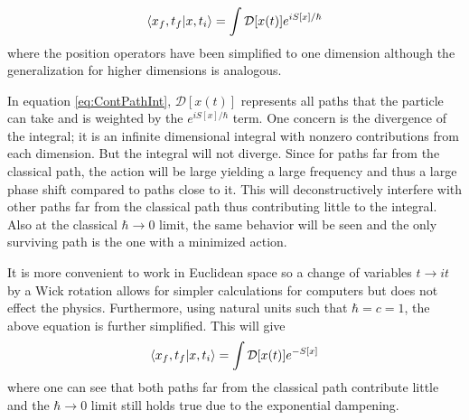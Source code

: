 \documentclass[11pt]{article}
\begin{document}
\begin{align}
	\bra{x_f,t_f}\ket{x,t_i}=\int\mathcal{D}[x(t)]e^{iS[x]/\hbar}
	\label{eq:ContPathInt}
\end{align}
where the position operators have been simplified to one dimension although the generalization for higher dimensions is analogous.

In equation \ref{eq:ContPathInt}, $\mathcal{D}[x(t)]$ represents all paths that the particle can take and is weighted by the $e^{iS[x]/\hbar}$ term. One concern is the divergence of the integral; it is an infinite dimensional integral with nonzero contributions from each dimension. But the integral will not diverge. Since for paths far from the classical path, the action will be large yielding a large frequency and thus a large phase shift compared to paths close to it. This will deconstructively interfere with other paths far from the classical path thus contributing little to the integral. Also at the classical $\hbar\to0$ limit, the same behavior will be seen and the only surviving path is the one with a minimized action.

It is more convenient to work in Euclidean space so a change of variables $t\to it$ by a Wick rotation allows for simpler calculations for computers but does not effect the physics. Furthermore, using natural units such that $\hbar=c=1$, the above equation is further simplified. This will give
\begin{align}
	\bra{x_f,t_f}\ket{x,t_i}=\int\mathcal{D}[x(t)]e^{-S[x]}
\end{align}	
where one can see that both paths far from the classical path contribute little and the $\hbar\to0$ limit still holds true due to the exponential dampening.
\end{document}
